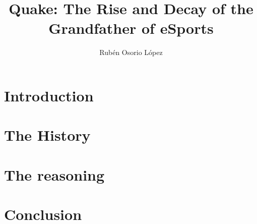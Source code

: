 \documentclass[twocolumn]{article}
\title{Quake: The Rise and Decay of the Grandfather of eSports}
\author{Rubén Osorio López}
\begin{document}
\maketitle

\begin{abstract}

\end{abstract}

\section{Introduction}


\section{The History}


\section{The reasoning}


\section{Conclusion}

\end{document}
